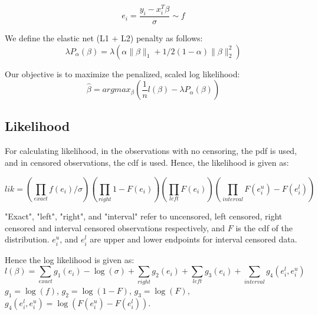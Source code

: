 \documentclass[12pt,a4paper]{report}
\begin{document}
\begin{equation}
	e_i = \frac{y_i - x_i^T \beta} {\sigma} \sim f
\end{equation}


\vspace{4mm}
We define the elastic net (L1 + L2) penalty as follows:
\begin{equation} \label{elastic}
\lambda P_{\alpha}(\beta) = \lambda(\alpha \|\beta\|_1 + 1/2 (1-\alpha) \|\beta\|_2^2)
\end{equation}

Our objective is to maximize the penalized, scaled log likelihood:
\begin{equation} \label{objective}
  \hat \beta = argmax_{\beta} \left( \frac{1}{n} l(\beta) - \lambda P_{\alpha}(\beta) \right)
\end{equation}



\subsection*{Likelihood}
For calculating likelihood, in the observations with no censoring, the pdf is used, and in censored observations, the cdf is used. Hence, the likelihood is given as:

\begin{equation}
lik = \left (\prod_{exact} f(e_i) / \sigma\right) \left (\prod_{right} 1-F(e_i)\right) \left (\prod_{left} F(e_i)\right) \left (\prod_{interval} F(e_i^u) - F(e_i^l)\right )
\end{equation}

\vspace{4mm}
"Exact", "left", "right", and "interval" refer to uncensored, left censored, right censored and interval censored observations respectively, and $F$ is the cdf of the distribution. $e_i^u$, and $e_i^l$ are upper and lower endpoints for interval censored data.

\vspace{4mm}
Hence the log likelihood is given as:
\begin{equation} \label{lik0}
l(\beta) = \sum_{exact} g_1(e_i) - \log(\sigma) + \sum_{right} g_2(e_i) + \sum_{left} g_3(e_i) + \sum_{interval} g_4(e_i^l, e_i^u)
\end{equation}
$g_1 = \log(f)$, $g_2 = \log(1-F)$, $g_3 = \log(F)$, $g_4(e_i^l, e_i^u) = \log(F(e_i^u) - F(e_i^l))$.

%
\end{document}
